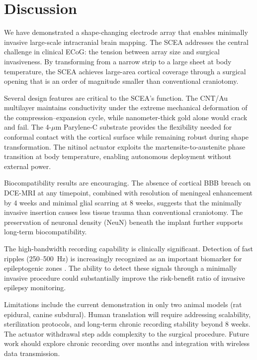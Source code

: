 \documentclass[11pt]{article}
\begin{document}
\section{Discussion}

We have demonstrated a shape-changing electrode array that enables minimally invasive large-scale intracranial brain mapping. The SCEA addresses the central challenge in clinical ECoG: the tension between array size and surgical invasiveness. By transforming from a narrow strip to a large sheet at body temperature, the SCEA achieves large-area cortical coverage through a surgical opening that is an order of magnitude smaller than conventional craniotomy.

Several design features are critical to the SCEA's function. The CNT/Au multilayer maintains conductivity under the extreme mechanical deformation of the compression--expansion cycle, while nanometer-thick gold alone would crack and fail. The 4-$\mu$m Parylene-C substrate provides the flexibility needed for conformal contact with the cortical surface while remaining robust during shape transformation. The nitinol actuator exploits the martensite-to-austenite phase transition at body temperature, enabling autonomous deployment without external power.

Biocompatibility results are encouraging. The absence of cortical BBB breach on DCE-MRI at any timepoint, combined with resolution of meningeal enhancement by 4 weeks and minimal glial scarring at 8 weeks, suggests that the minimally invasive insertion causes less tissue trauma than conventional craniotomy. The preservation of neuronal density (NeuN) beneath the implant further supports long-term biocompatibility.

The high-bandwidth recording capability is clinically significant. Detection of fast ripples (250--500~Hz) is increasingly recognized as an important biomarker for epileptogenic zones \citep{worrell2004high, jacobs2009high}. The ability to detect these signals through a minimally invasive procedure could substantially improve the risk-benefit ratio of invasive epilepsy monitoring.

Limitations include the current demonstration in only two animal models (rat epidural, canine subdural). Human translation will require addressing scalability, sterilization protocols, and long-term chronic recording stability beyond 8 weeks. The actuator withdrawal step adds complexity to the surgical procedure. Future work should explore chronic recording over months and integration with wireless data transmission.
\end{document}
